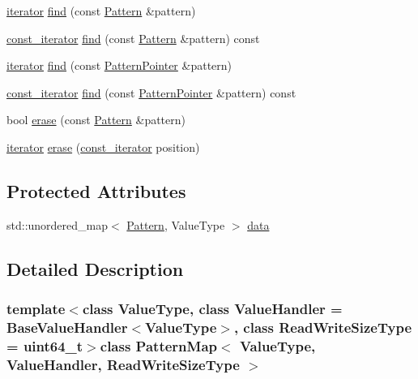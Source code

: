 \begin{DoxyCompactItemize}
\item 
\hyperlink{classPatternMap_a4de5ceaff3526d091098b4d82dde2b27}{iterator} \hyperlink{classPatternMap_a4f36d73514e80d18f93395a72f81e6bc}{find} (const \hyperlink{classPattern}{Pattern} \&pattern)
\item 
\hyperlink{classPatternMap_aba8ff62eadadedc25bf4ea799a322cf3}{const\+\_\+iterator} \hyperlink{classPatternMap_a685d9bac878f2d8862c6c193ba9de45e}{find} (const \hyperlink{classPattern}{Pattern} \&pattern) const 
\item 
\hyperlink{classPatternMap_a4de5ceaff3526d091098b4d82dde2b27}{iterator} \hyperlink{classPatternMap_a75e2cf7d74b8ffed73256324cfa1e3bf}{find} (const \hyperlink{classPatternPointer}{Pattern\+Pointer} \&pattern)
\item 
\hyperlink{classPatternMap_aba8ff62eadadedc25bf4ea799a322cf3}{const\+\_\+iterator} \hyperlink{classPatternMap_adeb3de7b7d2c4cfb0e3976a230950259}{find} (const \hyperlink{classPatternPointer}{Pattern\+Pointer} \&pattern) const 
\item 
bool \hyperlink{classPatternMap_a96e5a77a5c782f340fe38f5c05ae30c4}{erase} (const \hyperlink{classPattern}{Pattern} \&pattern)
\item 
\hyperlink{classPatternMap_a4de5ceaff3526d091098b4d82dde2b27}{iterator} \hyperlink{classPatternMap_ac7bfe17942e5fb3c1bad7f975b61b650}{erase} (\hyperlink{classPatternMap_aba8ff62eadadedc25bf4ea799a322cf3}{const\+\_\+iterator} position)
\end{DoxyCompactItemize}
\subsection*{Protected Attributes}
\begin{DoxyCompactItemize}
\item 
std\+::unordered\+\_\+map$<$ \hyperlink{classPattern}{Pattern}, Value\+Type $>$ \hyperlink{classPatternMap_af7de0fc22bf41d3d2a7a04260b431cb7}{data}
\end{DoxyCompactItemize}


\subsection{Detailed Description}
\subsubsection*{template$<$class Value\+Type, class Value\+Handler = Base\+Value\+Handler$<$\+Value\+Type$>$, class Read\+Write\+Size\+Type = uint64\+\_\+t$>$class Pattern\+Map$<$ Value\+Type, Value\+Handler, Read\+Write\+Size\+Type $>$}

